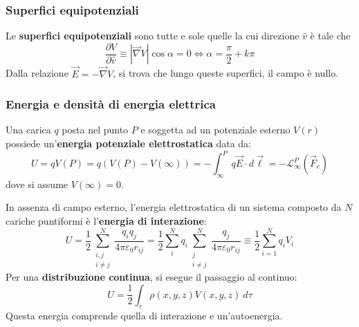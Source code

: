\documentclass[a4paper]{scrartcl}
\numberwithin{equation}{subsection}
\theoremstyle{style1}
\begin{document}
\subsubsection{Superfici equipotenziali}


\noindent Le \textbf{superfici equipotenziali} sono tutte e sole quelle la cui direzione $\hat{v}$ \`e tale che 
\[
\frac{\partial V}{\partial \hat{v} }  \equiv \left\lvert \vec{\nabla }V  \right\rvert  \cos \alpha  = 0 \iff\alpha = \frac{\pi}{2} + k\pi
\] 
Dalla relazione $\vec{E} = -\vec{\nabla }V$, si trova che lungo queste superfici, il campo \`e nullo.
\subsubsection{Energia e densit\`a di energia elettrica}


Una carica $q$ posta nel punto $P$ e soggetta ad un potenziale esterno $V(r)$ possiede un'\textbf{energia potenziale elettrostatica} data da:
\begin{equation}
	U = qV(P) = q(V(P) - V(\infty)) =-\int_{\infty} ^P q\vec{E}\cdot d\vec{\ell } =- \mathcal{L}_\infty^P (\vec{F}_e)
\end{equation}
dove si assume $V(\infty) = 0$.

In assenza di campo esterno, l'energia elettrostatica di un sistema composto da $N$ cariche puntiformi \`e l'\textbf{energia di interazione}:
\begin{equation}
	U = \frac{1}{2} \sum_{\substack{i,j\\ i\neq j}}^{N} \frac{q_iq_j}{4\pi \varepsilon _0 r_{ij} } = \frac{1}{2}\sum_{i}^{N} q_i \sum_{\substack{j \\ i\neq j}}^{N} \frac{q_j}{4 \pi \varepsilon _0 r_{ij} } \equiv \frac{1}{2}\sum_{i=1}^{N} q_i V_i
\end{equation}
Per una \textbf{distribuzione continua}, si esegue il passaggio al continuo:
\begin{equation}
	U=\frac{1}{2}\int_{\tau } \rho (x,y,z) V(x,y,z) \ d\tau 
\end{equation}
Questa energia comprende quella di interazione e un'autoenergia.
\end{document}
